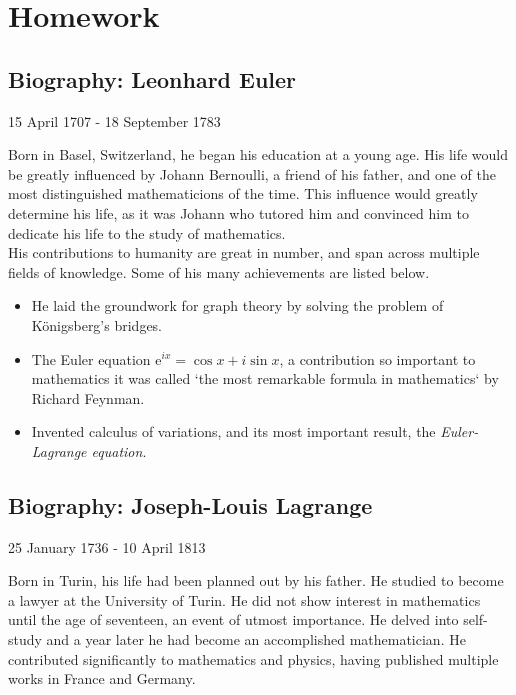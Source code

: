 \section{Homework}

\subsection{Biography: Leonhard Euler}

\begin{center}
 15 April 1707 - 18 September 1783
\end{center}

Born in Basel, Switzerland, he began his education at a young age.
His life would be greatly influenced by Johann Bernoulli, 
a friend of his father, and one of the most distinguished 
mathematicions of the time.
This influence would greatly determine his life, as it was Johann
who tutored him and convinced him to dedicate his life to the study
of mathematics.\\

His contributions to humanity are great in number, 
and span across multiple fields of knowledge. 
Some of his many achievements are listed below.

\begin{itemize}
 \item He laid the groundwork for graph theory by solving the problem of 
Königsberg's bridges. 
\item The Euler equation $\mathrm{e}^{ix} = \cos{x} + i \sin{x}$, 
a contribution so important to mathematics it was called 
`the most remarkable formula in mathematics` by Richard Feynman.
\item Invented calculus of variations, and its most important 
result, the \emph{Euler-Lagrange equation}.
\end{itemize}

\subsection{Biography: Joseph-Louis Lagrange}
\begin{center}
 25 January 1736 - 10 April 1813
\end{center}

Born in Turin, his life had been planned out by his father. 
He studied to become a lawyer at the University of Turin.
He did not show interest in mathematics until the age of seventeen,
an event of utmost importance. He delved into self-study and a year
later he had become an accomplished mathematician. 
He contributed significantly to mathematics and physics, having published
multiple works in France and Germany.

